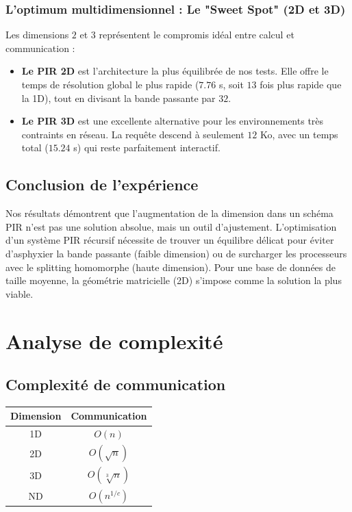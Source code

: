 \documentclass[12pt,a4paper]{report}
\begin{document}
\subsubsection{L'optimum multidimensionnel : Le "Sweet Spot" (2D et 3D)}
Les dimensions $2$ et $3$ représentent le compromis idéal entre calcul et communication :
\begin{itemize}
    \item \textbf{Le PIR 2D} est l'architecture la plus équilibrée de nos tests. Elle offre le temps de résolution global le plus rapide ($7.76$ s, soit $13$ fois plus rapide que la 1D), tout en divisant la bande passante par $32$.
    \item \textbf{Le PIR 3D} est une excellente alternative pour les environnements très contraints en réseau. La requête descend à seulement $12$ Ko, avec un temps total ($15.24$ s) qui reste parfaitement interactif.
\end{itemize}

\subsection{Conclusion de l'expérience}
Nos résultats démontrent que l'augmentation de la dimension dans un schéma PIR n'est pas une solution absolue, mais un outil d'ajustement. L'optimisation d'un système PIR récursif nécessite de trouver un équilibre délicat pour éviter d'asphyxier la bande passante (faible dimension) ou de surcharger les processeurs avec le splitting homomorphe (haute dimension). Pour une base de données de taille moyenne, la géométrie matricielle (2D) s'impose comme la solution la plus viable.


\section{Analyse de complexité}

\subsection{Complexité de communication}

\begin{center}

\begin{tabular}{|c|c|}
\hline
Dimension & Communication \\
\hline
1D & $O(n)$ \\
2D & $O(\sqrt{n})$ \\
3D & $O(\sqrt[3]{n})$ \\
ND & $O(n^{1/c})$ \\
\hline

\end{tabular}

\end{center}
\end{document}
